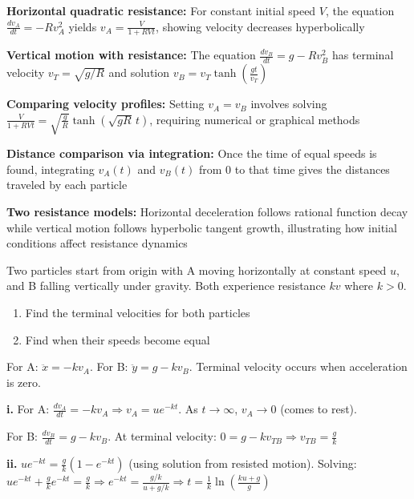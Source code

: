 \begin{takeaways}
\item \textbf{Horizontal quadratic resistance:} For constant initial speed $V$, the equation $\frac{dv_A}{dt} = -Rv_A^2$ yields $v_A = \frac{V}{1+RVt}$, showing velocity decreases hyperbolically
\item \textbf{Vertical motion with resistance:} The equation $\frac{dv_B}{dt} = g - Rv_B^2$ has terminal velocity $v_T = \sqrt{g/R}$ and solution $v_B = v_T\tanh\left(\frac{gt}{v_T}\right)$
\item \textbf{Comparing velocity profiles:} Setting $v_A = v_B$ involves solving $\frac{V}{1+RVt} = \sqrt{\frac{g}{R}}\tanh\left(\sqrt{gR}\,t\right)$, requiring numerical or graphical methods
\item \textbf{Distance comparison via integration:} Once the time of equal speeds is found, integrating $v_A(t)$ and $v_B(t)$ from $0$ to that time gives the distances traveled by each particle
\item \textbf{Two resistance models:} Horizontal deceleration follows rational function decay while vertical motion follows hyperbolic tangent growth, illustrating how initial conditions affect resistance dynamics
\end{takeaways}

\begin{problem}
Two particles start from origin with A moving horizontally at constant speed $u$, and B falling vertically under gravity. Both experience resistance $kv$ where $k > 0$.
\begin{enumerate}[label=\textbf{\roman*.}]
    \item Find the terminal velocities for both particles
    \item Find when their speeds become equal
\end{enumerate}
\end{problem}

\begin{hint}
For A: $\ddot{x} = -kv_A$. For B: $\ddot{y} = g - kv_B$. Terminal velocity occurs when acceleration is zero.
\end{hint}

\begin{solution}
\textbf{i.} For A: $\frac{dv_A}{dt} = -kv_A \Rightarrow v_A = ue^{-kt}$. As $t \to \infty$, $v_A \to 0$ (comes to rest).

For B: $\frac{dv_B}{dt} = g - kv_B$. At terminal velocity: $0 = g - kv_{TB} \Rightarrow v_{TB} = \frac{g}{k}$

\textbf{ii.} $ue^{-kt} = \frac{g}{k}(1-e^{-kt})$ (using solution from resisted motion). Solving: $ue^{-kt} + \frac{g}{k}e^{-kt} = \frac{g}{k} \Rightarrow e^{-kt} = \frac{g/k}{u + g/k} \Rightarrow t = \frac{1}{k}\ln\left(\frac{ku + g}{g}\right)$
\end{solution}

